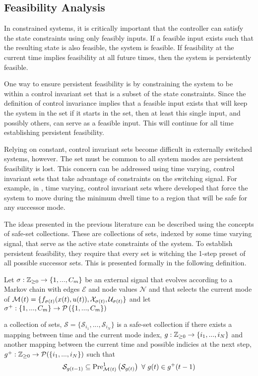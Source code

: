 \subsection{Feasibility Analysis}
In constrained systems, it is critically important that the controller can satisfy the state constraints using only feasibly inputs. If a feasible input exists such that the resulting state is also feasible, the system is feasible. If feasibility at the current time implies feasibility at all future times, then the system is persistently feasible.

One way to ensure persistent feasibility is by constraining the system to be within a control invariant set that is a subset of the state constraints. Since the definition of control invariance implies that a feasible input exists that will keep the system in the set if it starts in the set, then at least this single input, and possibly others, can serve as a feasible input. This will continue for all time establishing persistent feasibility. 

Relying on constant, control invariant sets become difficult in externally switched systems, however. The set must be common to all system modes are persistent feasibility is lost. This concern can be addressed using time varying, control invariant sets that take advantage of constraints on the switching signal. For example, in \cite{Danielson2019,Santis2004}, time varying, control invariant sets where developed that force the system to move during the minimum dwell time to a region that will be safe for any successor mode.

The ideas presented in the previous literature can be described using the concepts of safe-set collections. These are collections of sets, indexed by some time varying signal, that serve as the active state constraints of the system. To establish persistent feasibility, they require that every set is witching the 1-step preset of all possible successor sets. This is presented formally in the following definition.
\begin{definition}
Let $\ss:\int\rgeq 0\rightarrow \{1,...,\nummodes\}$ be an external signal that evolves according to a Markov chain with edges $\mathcal{E}$ and node values $\mathcal{N}$ and that selects the current mode of $\mode{}(t)=\{f_{\ss(t)}(x(t),u(t)),\xcon[\ss(t)],\ucon[\ss(t)]\}$ and let $\ss^+:\{1,...,\nummodes\}\rightarrow\mathcal{P}\left(\{1,...,\nummodes\}\right)$ 

 a collection of sets, $\mathcal{S}=\{\mathcal{S}_{i_1},...,\mathcal{S}_{i_N}\}$ is a safe-set collection if there exists a mapping between time and the current mode index, $g:\mathbb{Z}_{\geq 0}\rightarrow\{i_1,...,i_N\}$ and another mapping between the current time and possible  indicies at the next step, $g^+:\mathbb{Z}_{\geq 0}\rightarrow\mathcal{P}(\{i_1,...,i_N\})$ such that
$$\mathcal{S}_{g(t-1)}\subseteq\Pre[\mode{}(t)][1]{\mathcal{S}_{g(t)}}\ \forall\ g(t)\in g^+(t-1)$$
\end{definition}
